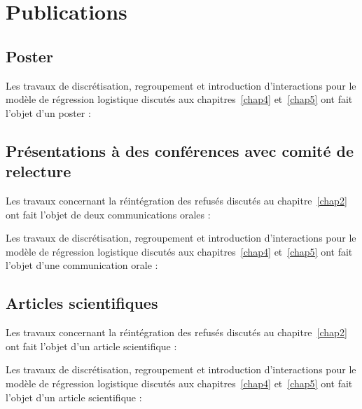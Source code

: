 \chapter{Publications}

\section{Poster}

Les travaux de discrétisation, regroupement et introduction d'interactions pour le modèle de régression logistique discutés aux chapitres~\ref{chap4} et~\ref{chap5} ont fait l'objet d'un poster :



\section{Présentations à des conférences avec comité de relecture}

Les travaux concernant la réintégration des refusés discutés au chapitre~\ref{chap2} ont fait l'objet de deux communications orales :


Les travaux de discrétisation, regroupement et introduction d'interactions pour le modèle de régression logistique discutés aux chapitres~\ref{chap4} et~\ref{chap5} ont fait l'objet d'une communication orale :


\section{Articles scientifiques}

Les travaux concernant la réintégration des refusés discutés au chapitre~\ref{chap2} ont fait l'objet d'un article scientifique :

Les travaux de discrétisation, regroupement et introduction d'interactions pour le modèle de régression logistique discutés aux chapitres~\ref{chap4} et~\ref{chap5} ont fait l'objet d'un article scientifique :

